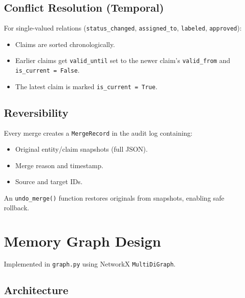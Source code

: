 \documentclass[11pt,a4paper]{article}
\begin{document}
\subsection{Conflict Resolution (Temporal)}
For single-valued relations (\texttt{status\_changed}, \texttt{assigned\_to}, \texttt{labeled}, \texttt{approved}):
\begin{itemize}[nosep]
    \item Claims are sorted chronologically.
    \item Earlier claims get \texttt{valid\_until} set to the newer claim's \texttt{valid\_from} and \texttt{is\_current = False}.
    \item The latest claim is marked \texttt{is\_current = True}.
\end{itemize}

\subsection{Reversibility}
Every merge creates a \texttt{MergeRecord} in the audit log containing:
\begin{itemize}[nosep]
    \item Original entity/claim snapshots (full JSON).
    \item Merge reason and timestamp.
    \item Source and target IDs.
\end{itemize}
An \texttt{undo\_merge()} function restores originals from snapshots, enabling safe rollback.

\section{Memory Graph Design}

Implemented in \texttt{graph.py} using NetworkX \texttt{MultiDiGraph}.

\subsection{Architecture}
\end{document}
